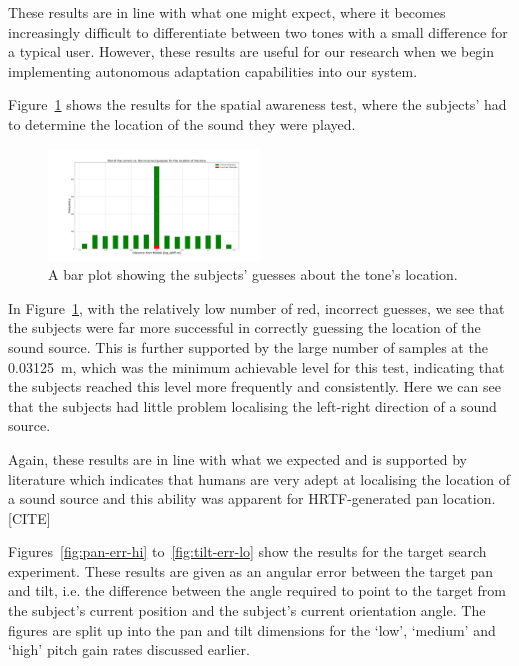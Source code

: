 \documentclass[format=sigconf, review=true, screen=true, anonymous=true]{acmart}
\begin{document}
These results are in line with what one might expect, where it becomes increasingly difficult to differentiate between two tones with a small difference for a typical user. However, these results are useful for our research when we begin implementing autonomous adaptation capabilities into our system. 

Figure~\ref{fig:location-guesses} shows the results for the spatial awareness test, where the subjects' had to determine the location of the sound they were played. 

\begin{figure}
  \centering
  \includegraphics[width=0.5\textwidth]{figures/location_guesses.png}
  \caption{A bar plot showing the subjects' guesses about the tone's location.}
  \label{fig:location-guesses}
\end{figure}

In Figure~\ref{fig:location-guesses}, with the relatively low number of red, incorrect guesses, we see that the subjects were far more successful in correctly guessing the location of the sound source. This is further supported by the large number of samples at the \SI{0.03125}{\m}, which was the minimum achievable level for this test, indicating that the subjects reached this level more frequently and consistently. Here we can see that the subjects had little problem localising the left-right direction of a sound source. 

Again, these results are in line with what we expected and is supported by literature which indicates that humans are very adept at localising the location of a sound source and this ability was apparent for HRTF-generated pan location. [CITE]

Figures~\ref{fig:pan-err-hi} to~\ref{fig:tilt-err-lo} show the results for the target search experiment. These results are given as an angular error between the target pan and tilt, i.e. the difference between the angle required to point to the target from the subject's current position and the subject's current orientation angle. The figures are split up into the pan and tilt dimensions for the `low', `medium' and `high' pitch gain rates discussed earlier. 
\end{document}
